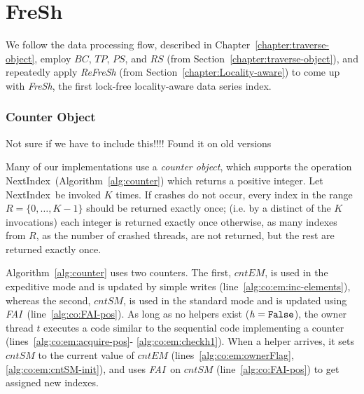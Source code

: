 \documentclass[a4paper,11pt,twoside,openany]{book}
\newcommand{\rb}[1]{{\color{red} #1}\normalcolor}
\newcommand{\FAI}{\mbox{\textit{FAI}}}
\newcommand{\False}{\mbox{\texttt{False}}}
\newcommand{\NextIndex}{\mbox{\sc NextIndex}}
\begin{document}
\chapter{FreSh}
\label{chapter:FreSh}

We follow the data processing flow, described in Chapter~\ref{chapter:traverse-object},
employ $\mathit{BC}$, $\mathit{TP}$, $\mathit{PS}$, and $\mathit{RS}$ (from Section~\ref{chapter:traverse-object}),
and repeatedly apply \textit{ReFreSh} (from Section~\ref{chapter:Locality-aware}) to come up with \textit{FreSh},
the first lock-free locality-aware data series index.

\subsection{Counter Object}

\rb{Not sure if we have to include this!!!! Found it on old versions}


Many of our implementations use a {\em counter object}, which supports the
operation \NextIndex\ (Algorithm~\ref{alg:counter}) which returns a positive integer. 
Let \NextIndex\ be invoked $K$ times.
If crashes do not occur, every index in the range $R = 
\{0, \ldots, K-1\}$ should be returned exactly once; 
(i.e. by a distinct of the $K$ invocations) each integer 
is returned exactly once otherwise, as many indexes from $R$,
as the number of crashed  threads, 
are not returned, but the rest are returned exactly once.

Algorithm~\ref{alg:counter} uses two counters. The first, $\mathit{cntEM}$,
is used in the expeditive mode and is updated by simple writes
(line~\ref{alg:co:em:inc-elements}),
whereas the second, $\mathit{cntSM}$, is used in the standard mode and
is updated using \FAI\ (line~\ref{alg:co:FAI-pos}).
As long as no helpers exist ($\mathit{h = \False}$), the owner thread $t$ executes 
a code similar to the sequential code implementing a counter (lines~\ref{alg:co:em:acquire-pos}-
\ref{alg:co:em:checkh1}). When a helper arrives, it sets $\mathit{cntSM}$ to the current
value of $cntEM$ (lines~\ref{alg:co:em:ownerFlag}, \ref{alg:co:em:cntSM-init}),
and uses \FAI\ on $\mathit{cntSM}$ (line~\ref{alg:co:FAI-pos}) to get assigned new indexes. 
\end{document}
